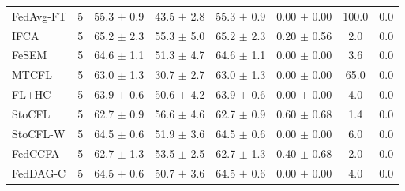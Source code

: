 {{\begin{tabular}{l r c c c c c c}
FedAvg-FT & 5 & 55.3 $\pm$ 0.9 & 43.5 $\pm$ 2.8 & 55.3 $\pm$ 0.9 & 0.00 $\pm$ 0.00 & 100.0 & 0.0 \\
IFCA & 5 & 65.2 $\pm$ 2.3 & 55.3 $\pm$ 5.0 & 65.2 $\pm$ 2.3 & 0.20 $\pm$ 0.56 & 2.0 & 0.0 \\
FeSEM & 5 & 64.6 $\pm$ 1.1 & 51.3 $\pm$ 4.7 & 64.6 $\pm$ 1.1 & 0.00 $\pm$ 0.00 & 3.6 & 0.0 \\
MTCFL & 5 & 63.0 $\pm$ 1.3 & 30.7 $\pm$ 2.7 & 63.0 $\pm$ 1.3 & 0.00 $\pm$ 0.00 & 65.0 & 0.0 \\
FL+HC & 5 & 63.9 $\pm$ 0.6 & 50.6 $\pm$ 4.2 & 63.9 $\pm$ 0.6 & 0.00 $\pm$ 0.00 & 4.0 & 0.0 \\
StoCFL & 5 & 62.7 $\pm$ 0.9 & 56.6 $\pm$ 4.6 & 62.7 $\pm$ 0.9 & 0.60 $\pm$ 0.68 & 1.4 & 0.0 \\
StoCFL-W & 5 & 64.5 $\pm$ 0.6 & 51.9 $\pm$ 3.6 & 64.5 $\pm$ 0.6 & 0.00 $\pm$ 0.00 & 6.0 & 0.0 \\
FedCCFA & 5 & 62.7 $\pm$ 1.3 & 53.5 $\pm$ 2.5 & 62.7 $\pm$ 1.3 & 0.40 $\pm$ 0.68 & 2.0 & 0.0 \\
FedDAG-C & 5 & 64.5 $\pm$ 0.6 & 50.7 $\pm$ 3.6 & 64.5 $\pm$ 0.6 & 0.00 $\pm$ 0.00 & 4.0 & 0.0 \\
\bottomrule
\end{tabular}}
}

